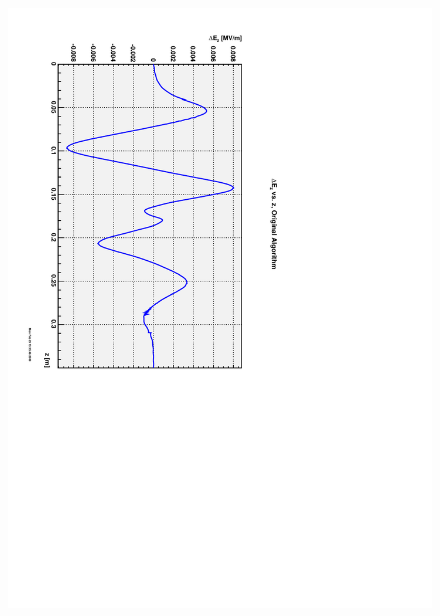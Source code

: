 \documentclass{report}
\begin{document}
\begin{figure}[hbt]
{    \includegraphics[scale=0.4,angle=90.0]{field-diff-original-CTF3.pdf}} \\
  \subfloat[][]{
    \label{Fi:figure-1c}
}
\end{figure}
\end{document}
